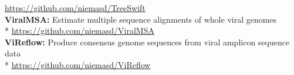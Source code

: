 \documentclass[margin,line]{res}
\begin{document}
\begin{resume}
\hspace*{4mm} \href{https://github.com/niemasd/TreeSwift}{https://github.com/niemasd/TreeSwift}\\
\textbf{ViralMSA:} Estimate multiple sequence alignments of whole viral genomes\\*\vspace{2mm}
\hspace*{4mm} \href{https://github.com/niemasd/ViralMSA}{https://github.com/niemasd/ViralMSA}\\
\textbf{ViReflow:} Produce consensus genome sequences from viral amplicon sequence data\\*\vspace{2mm}
\hspace*{4mm} \href{https://github.com/niemasd/ViralMSA}{https://github.com/niemasd/ViReflow}\\


\end{resume}
\end{document}
